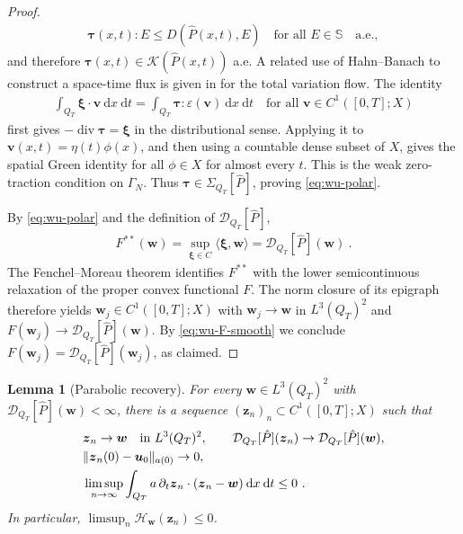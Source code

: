 \documentclass{article}
\newtheorem{lemma}[theorem]{Lemma}
\theoremstyle{definition}
\newcommand{\bfu}{\boldsymbol{u}}
\newcommand{\bfv}{\boldsymbol{v}}
\newcommand{\bfw}{\boldsymbol{w}}
\newcommand{\bftau}{\boldsymbol{\tau}}
\newcommand{\bfxi}{\boldsymbol{\xi}}
\newcommand{\K}{\mathcal{K}}
\newcommand{\D}{\mathcal{D}}
\newcommand{\dd}{\:\mathrm{d}}
\newcommand{\bfz}{\boldsymbol{z}}
\newcommand{\Hh}{\mathcal{H}}
\renewcommand\div{\operatorname{\mathrm{div}}}
\begin{document}
\begin{proof}
\begin{align*}
 \bftau(x,t):E\leq D(\hat P(x,t),E)\quad\text{for all }E\in\mathbb S
 \quad\text{a.e.},
\end{align*}
and therefore $\bftau(x,t)\in\K(\hat P(x,t))$ a.e.
A related use of Hahn--Banach to construct a space-time flux is given in
\cite[Section 5.4]{KS22} for the total variation flow.
The identity
\begin{align*}
 \int_{Q_T}\bfxi\cdot \bfv\dd x\dd t
   =\int_{Q_T}\bftau:\varepsilon(\bfv)\dd x\dd t\quad\text{for all }\bfv\in C^1([0,T];X)
\end{align*}
first gives $-\div\bftau=\bfxi$ in the distributional sense. Applying it to
$\bfv(x,t)=\eta(t)\phi(x)$, and then using a countable dense subset of $X$,
gives the spatial Green identity for all $\phi\in X$ for almost every
$t$. This is the weak zero-traction condition on $\Gamma_N$. Thus
$\bftau\in\Sigma_{Q_T}[\hat P]$, proving \eqref{eq:wu-polar}.

By \eqref{eq:wu-polar} and the definition of $\D_{Q_T}[\hat P]$,
\begin{align*}
 F^{**}(\bfw)=\sup_{\bfxi\in C}\langle\bfxi,\bfw\rangle=\D_{Q_T}[\hat P](\bfw) \ .
\end{align*}
The Fenchel--Moreau theorem \cite[Chapter I]{ET99} identifies $F^{**}$ with the lower
semicontinuous relaxation of the proper convex functional $F$.
The norm closure of its epigraph therefore yields $\bfw_j\in C^1([0,T];X)$ with
$\bfw_j\rightarrow \bfw$ in $L^3(Q_T)^2$ and $F(\bfw_j)\rightarrow\D_{Q_T}[\hat P](\bfw)$. By
\eqref{eq:wu-F-smooth} we conclude $F(\bfw_j)=\D_{Q_T}[\hat P](\bfw_j)$, as claimed.
\end{proof}

\begin{lemma}[Parabolic recovery]\label{lem:wu-parabolic}
For every $\bfw\in L^3(Q_T)^2$ with $\D_{Q_T}[\hat P](\bfw)<\infty$, there is
a sequence $(\bfz_n)_n\subset C^1([0,T];X)$ such that
\begin{align}
 &\bfz_n\rightarrow \bfw\quad\text{in }L^3(Q_T)^2,\qquad
 \D_{Q_T}[\hat P](\bfz_n)\rightarrow\D_{Q_T}[\hat P](\bfw),\label{eq:wu-recovery-energy}\\
 &\Vert\bfz_n(0)-\bfu_0\Vert_{a(0)}\rightarrow0,\notag\\
 &\limsup_{n\rightarrow\infty}\int_{Q_T} a\,\partial_t \bfz_n\cdot(\bfz_n-\bfw)
       \dd x\dd t\leq0 \ .\label{eq:wu-recovery-time}
\end{align}
In particular, $\limsup_n\Hh_{\bfw}(\bfz_n)\leq0$.
\end{lemma}
\end{document}
